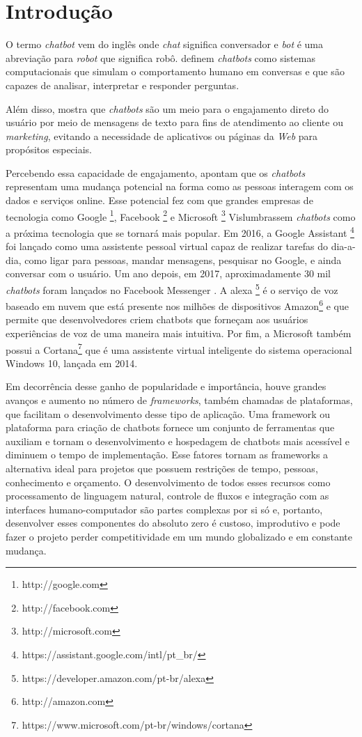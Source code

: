 \chapter{Introdução}

 O termo \textit{chatbot} vem do inglês onde \textit{chat} significa conversador e \textit{bot} é uma abreviação para \textit{robot} que significa robô.  definem \textit{chatbots}
como sistemas computacionais que simulam o comportamento humano em conversas e que são capazes de analisar, interpretar e responder perguntas.

Além disso,  mostra que \textit{chatbots} são  um meio para o engajamento direto do usuário por meio de mensagens de texto para fins de atendimento ao cliente ou \textit{marketing}, evitando a necessidade de aplicativos ou páginas da \textit{Web} para propósitos especiais.

Percebendo essa capacidade de engajamento,  apontam que os \textit{chatbots} representam uma mudança potencial na forma como as pessoas interagem com os dados e serviços online. Esse potencial fez com que grandes empresas de tecnologia como Google \footnote{http://google.com}, Facebook \footnote{http://facebook.com} e Microsoft \footnote{http://microsoft.com} Vislumbrassem \textit{chatbots} como a próxima tecnologia que se tornará mais popular. Em 2016, a Google Assistant \footnote{https://assistant.google.com/intl/pt_br/} foi lançado como uma  assistente pessoal virtual capaz de realizar tarefas do dia-a-dia, como ligar para pessoas, mandar mensagens, pesquisar no Google, e ainda conversar com o usuário. Um ano depois, em 2017, aproximadamente 30 mil \textit{chatbots} foram lançados no Facebook Messenger \cite{brandtzaeg2017people}. A alexa \footnote{https://developer.amazon.com/pt-br/alexa} é o serviço de voz baseado em nuvem que está presente nos milhões de dispositivos Amazon\footnote{http://amazon.com} e que permite que desenvolvedores criem chatbots que forneçam aos usuários experiências de voz de uma maneira mais intuitiva. Por fim, a Microsoft também possui a Cortana\footnote{https://www.microsoft.com/pt-br/windows/cortana} que é uma assistente virtual inteligente do sistema operacional Windows 10, lançada em 2014. 

Em decorrência desse ganho de popularidade e importância, houve grandes avanços e aumento no número de \textit{frameworks}, também chamadas de plataformas, que facilitam o desenvolvimento desse tipo de aplicação. Uma framework ou plataforma para criação de chatbots fornece um conjunto de ferramentas que auxiliam e tornam o desenvolvimento e hospedagem de chatbots mais acessível e diminuem o tempo de implementação. Esse fatores tornam as frameworks a alternativa ideal para projetos que possuem restrições de tempo, pessoas, conhecimento e orçamento. O desenvolvimento de todos esses recursos como processamento de linguagem natural, controle de fluxos e integração com as interfaces humano-computador são partes complexas por si só e, portanto, desenvolver esses componentes do absoluto zero é custoso, improdutivo e pode fazer o projeto perder competitividade em um mundo globalizado e em constante mudança.

